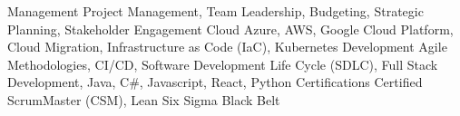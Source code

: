 
\begin{cvskills}
  \cvskill
  {Management} %
  {Project Management, Team Leadership, Budgeting, Strategic Planning, Stakeholder Engagement} %
  \cvskill
  {Cloud} %
  {Azure, AWS, Google Cloud Platform, Cloud Migration, Infrastructure as Code (IaC), Kubernetes} %
  \cvskill
  {Development} %
  {Agile Methodologies, CI/CD, Software Development Life Cycle (SDLC), Full Stack Development, Java, C\#, Javascript, React, Python} %
  \cvskill
  {Certifications} %
  {Certified ScrumMaster (CSM), Lean Six Sigma Black Belt} %
\end{cvskills}
